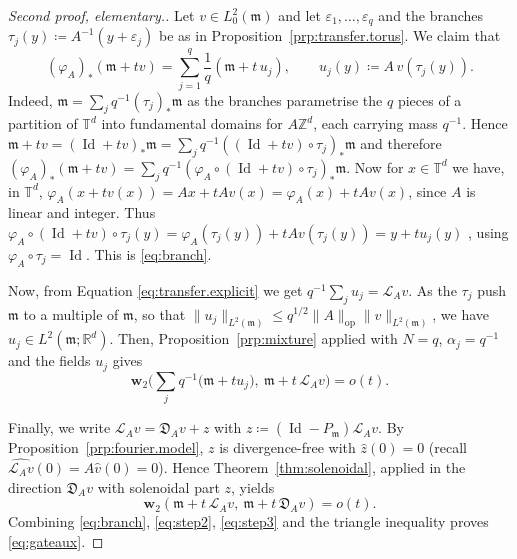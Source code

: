 \documentclass[11pt,reqno]{amsart}
\theoremstyle{plain}
\theoremstyle{definition}
\newcommand{\dw}{\mathbf{w}_2}
\newcommand{\T}{\mathbb{T}}
\newcommand{\Z}{\mathbb{Z}}
\newcommand{\R}{\mathbb{R}}
\newcommand{\Leb}{\mathfrak{m}}
\newcommand{\D}{\mathfrak{D}}
\newcommand{\Transf}{\mathcal{L}}
\DeclareMathOperator{\Id}{Id}
\begin{document}
\begin{proof}[Second proof, elementary.]
    Let \( v\in L^2_0(\Leb) \) and let \( \varepsilon_1,\dots,\varepsilon_{q} \) and the branches \( \tau_j(y)\coloneqq A^{-1}(y+\varepsilon_j) \) be as in Proposition~\ref{prp:transfer.torus}.
    We claim that \begin{equation}\label{eq:branch}
        ( \varphi_A )_\ast \left(\Leb+tv\right)
        =\sum_{j=1}^{q}\frac{1}{q}\left(\Leb+t\,u_j\right),
        \qquad u_j(y)\coloneqq A\,v\left(\tau_j(y)\right).
    \end{equation}
    Indeed, \( \Leb=\sum_j q^{-1}(\tau_j)_\ast \Leb \) as the branches parametrise the \( q \) pieces of a partition of \( \T^d \) into fundamental domains for \( A\Z^d \), each carrying mass \( q^{-1} \).
    Hence \( \Leb+tv=(\Id+tv)_\ast  \Leb=\sum_jq^{-1}\left((\Id+tv)\circ\tau_j\right)_\ast \Leb \) and therefore \( ( \varphi_A )_\ast (\Leb+tv)=\sum_jq^{-1}\left(\varphi_A \circ(\Id+tv)\circ\tau_j\right)_\ast \Leb \).
    Now for \( x\in\T^d \) we have, in \( \T^d \), \(  \varphi_A (x+tv(x))=Ax+tAv(x)= \varphi_A (x)+tAv(x) \), since \( A \) is linear and integer.
    Thus \( \varphi_A \circ(\Id+tv)\circ\tau_j(y)= \varphi_A (\tau_j(y))+tAv(\tau_j(y)) =y+tu_j(y)\) , using  \( \varphi_A \circ\tau_j=\Id\).
    This is \eqref{eq:branch}.

    Now, from Equation \eqref{eq:transfer.explicit} we get \( q^{-1}\sum_ju_j=\Transf_A v \).
    As the \( \tau_j \) push \( \Leb \) to a multiple of \( \Leb \), so that \( \lVert u_j \rVert_{L^2(\Leb)}\le q^{1/2}\lVert A \rVert_{\mathrm{op}}\lVert v \rVert_{L^2(\Leb)} \), we have \( u_j\in L^2(\Leb;\R^d) \).
    Then, Proposition~\ref{prp:mixture} applied with \( N=q \), \( \alpha_j=q^{-1} \) and the fields \( u_j \) gives
    \begin{equation}\label{eq:step2}
        \dw\Big(\sum_j q^{-1}\big(\Leb+tu_j\big),\ \Leb+t\,\Transf_A v\Big)=o(t).
    \end{equation}

    Finally, we write \( \Transf_A v=\D_Av+z \) with \( z\coloneqq (\Id-P_\Leb)\Transf_A v \).
    By Proposition~\ref{prp:fourier.model}, \( z \) is divergence-free with \( \hat z(0)=0 \)  (recall \( \widehat{\Transf_A v}(0)=A\hat v(0)=0 \)).
    Hence Theorem~\ref{thm:solenoidal}, applied in the direction \(\D_Av\) with solenoidal part \(z\), yields
    \begin{equation}\label{eq:step3}
        \dw\left(\Leb+t\,\Transf_A v,\ \Leb+t\,\D_Av\right)=o(t).
    \end{equation}
    Combining \eqref{eq:branch}, \eqref{eq:step2}, \eqref{eq:step3} and the triangle inequality proves \eqref{eq:gateaux}.


\end{proof}
\end{document}
